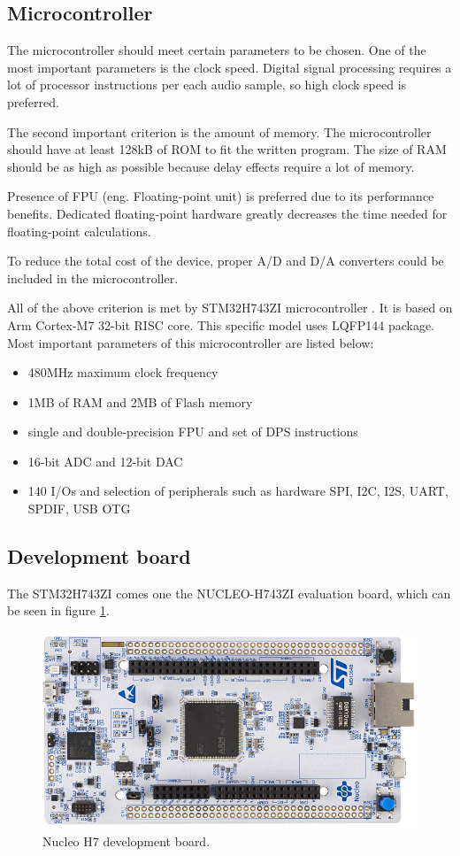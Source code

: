 \documentclass[a4paper,twoside,12pt]{book}
\begin{document}
\subsection {Microcontroller}
The microcontroller should meet certain parameters to be chosen.
One of the most important parameters is the clock speed.
Digital signal processing requires a lot of processor instructions
per each audio sample, so high clock speed is preferred.

The second important criterion is the amount of memory.
The microcontroller should have at least 128kB of ROM
to fit the written program.
The size of RAM should be as high as possible
because delay effects require a lot of memory.

Presence of FPU (eng. Floating-point unit) is preferred due to its performance benefits.
Dedicated floating-point hardware greatly decreases the time
needed for floating-point calculations.

To reduce the total cost of the device,
proper A/D and D/A converters could be included in the microcontroller.

All of the above criterion is met by STM32H743ZI microcontroller
\cite{ST:RM}.
It is based on Arm Cortex-M7 32-bit RISC core.
This specific model uses LQFP144 package.
Most important parameters of this microcontroller are listed below:
\begin{itemize}
    \item 480MHz maximum clock frequency
    \item 1MB of RAM and 2MB of Flash memory
    \item single and double-precision FPU and set of DPS instructions
    \item 16-bit ADC and 12-bit DAC
    \item 140 I/Os and selection of peripherals such as hardware
    SPI, I2C, I2S, UART, SPDIF, USB OTG
\end{itemize}

\subsection{Development board}
The STM32H743ZI comes one the NUCLEO-H743ZI evaluation board,
which can be seen in figure \ref{fig:Nucleo}.

\begin{figure}[H]
    \centering
    \includegraphics[width=\textwidth]{images/Nucleo}
    \caption{Nucleo H7 development board\cite{ST:UM2407}.}
    \label{fig:Nucleo}
\end{figure}
\end{document}
